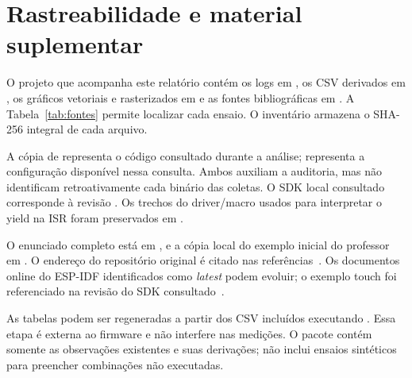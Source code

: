 \section{Rastreabilidade e material suplementar}
\label{ap:fontes}
\begin{singlespace}

O projeto que acompanha este relatório contém os logs em , os CSV derivados em , os gráficos vetoriais e rasterizados em  e as fontes bibliográficas em . A Tabela~\ref{tab:fontes} permite localizar cada ensaio. O inventário armazena o SHA-256 integral de cada arquivo.



A cópia de  representa o código consultado durante a análise;  representa a configuração disponível nessa consulta. Ambos auxiliam a auditoria, mas não identificam retroativamente cada binário das coletas. O SDK local consultado corresponde à revisão . Os trechos do driver/macro usados para interpretar o yield na ISR foram preservados em .

O enunciado completo está em , e a cópia local do exemplo inicial do professor em . O endereço do repositório original é citado nas referências~\cite{viel_codigo}. Os documentos online do ESP-IDF identificados como \textit{latest} podem evoluir; o exemplo touch foi referenciado na revisão do SDK consultado~\cite{idf_touch_example}.

As tabelas podem ser regeneradas a partir dos CSV incluídos executando . Essa etapa é externa ao firmware e não interfere nas medições. O pacote contém somente as observações existentes e suas derivações; não inclui ensaios sintéticos para preencher combinações não executadas.
\end{singlespace}
